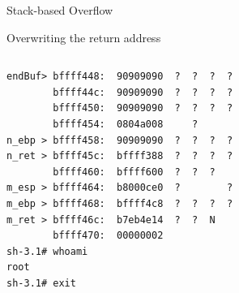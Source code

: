 \begin{frame}{Stack-based Overflow}
\begin{block}{Overwriting the return address}
\begin{columns}[T]
\begin{column}{.4\textwidth}
\begin{verbatim}
endBuf> bffff448:  90909090  ?  ?  ?  ?
        bffff44c:  90909090  ?  ?  ?  ?
        bffff450:  90909090  ?  ?  ?  ?
        bffff454:  0804a008     ?  
n_ebp > bffff458:  90909090  ?  ?  ?  ?
n_ret > bffff45c:  bffff388  ?  ?  ?  ?
        bffff460:  bffff600  ?  ?  ?  
m_esp > bffff464:  b8000ce0  ?        ?
m_ebp > bffff468:  bffff4c8  ?  ?  ?  ?
m_ret > bffff46c:  b7eb4e14  ?  ?  N  
        bffff470:  00000002           
sh-3.1# whoami
root
sh-3.1# exit
	\end{verbatim}
	\end{column}
\end{columns}
	\end{block}
\end{frame}
